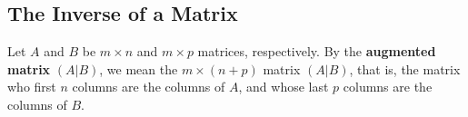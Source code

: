 \begin{eg}
    
\end{eg}

\subsection{The Inverse of a Matrix}

\begin{definition}
   Let \( A  \) and \( B  \) be \( m \times n  \) and \( m \times p  \) matrices, respectively. By the \textbf{augmented matrix} \( (A|B)  \), we mean the \( m \times (n + p)  \) matrix \( (A|B)  \), that is, the matrix who first \( n  \) columns are the columns of \( A  \), and whose last \( p  \) columns are the columns of \( B  \). 
\end{definition}

